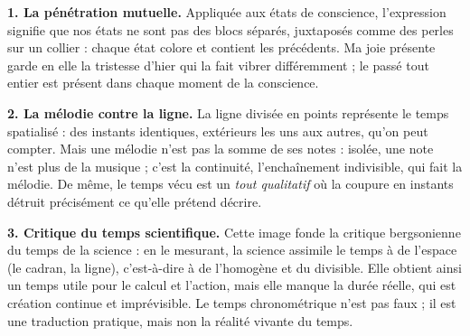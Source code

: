 \documentclass[11pt]{article}
\newcommand{\cle}[1]{{\popxbold\color{popdark}#1}}
\begin{document}
\begin{corrige}

\textbf{1. La pénétration mutuelle.} Appliquée aux états de conscience, l'expression signifie que nos états ne sont pas des blocs séparés, juxtaposés comme des perles sur un collier : chaque état colore et contient les précédents. Ma joie présente garde en elle la tristesse d'hier qui la fait vibrer différemment ; le passé tout entier est présent dans chaque moment de la conscience.

\textbf{2. La mélodie contre la ligne.} La ligne divisée en points représente le temps spatialisé : des instants identiques, extérieurs les uns aux autres, qu'on peut compter. Mais une mélodie n'est pas la somme de ses notes : isolée, une note n'est plus de la musique ; c'est la continuité, l'enchaînement indivisible, qui fait la mélodie. De même, le temps vécu est un \emph{tout qualitatif} où la coupure en instants détruit précisément ce qu'elle prétend décrire.

\textbf{3. Critique du temps scientifique.} Cette image fonde la critique bergsonienne du temps de la science : en le mesurant, la science assimile le temps à de l'espace (le cadran, la ligne), c'est-à-dire à de l'homogène et du divisible. Elle obtient ainsi un temps utile pour le calcul et l'action, mais elle manque la \cle{durée} réelle, qui est création continue et imprévisible. Le temps chronométrique n'est pas faux ; il est une traduction pratique, mais non la réalité vivante du temps.
\end{corrige}
\end{document}

